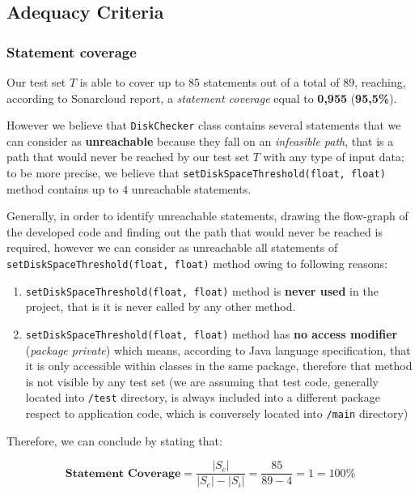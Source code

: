 \documentclass[sigconf]{acmart}
\newcommand{\abs}[1]{\left|#1\right|}
\begin{document}
\subsection{Adequacy Criteria}

\subsubsection{Statement coverage}

Our test set $T$ is able to cover up to $85$ statements out of a total of $89$, reaching, according to Sonarcloud report, a \textit{statement coverage} equal to \textbf{0,955} (\textbf{95,5\%}).

However we believe that \texttt{DiskChecker} class contains several statements that we can consider as \textbf{unreachable} because they fall on an \textit{infeasible path}, that is a path that would never be reached by our test set $T$ with any type of input data; to be more precise, we believe that  \texttt{setDiskSpaceThreshold(float, float)} method contains up to $4$ unreachable statements. 

Generally, in order to identify unreachable statements, drawing the flow-graph of the developed code and finding out the path that would never be reached is required, however we can consider as unreachable all statements of \texttt{setDiskSpaceThreshold(float, float)} method owing to following reasons:

\begin{enumerate}
\item \texttt{setDiskSpaceThreshold(float, float)} method is \textbf{never used} in the project, that is it is never called by any other method.
\item \texttt{setDiskSpaceThreshold(float, float)} method has \textbf{no access modifier} (\textit{package private}) which means, according to Java language specification, that it is only accessible within classes in the same package, therefore that method is not visible by any test set (we are assuming that test code, generally located into \texttt{/test} directory, is always included into a different package respect to application code, which is conversely located into \texttt{/main} directory)
\end{enumerate}

Therefore, we can conclude by stating that:

\begin{equation} 
\textbf{Statement Coverage} = \dfrac{\abs{S_c}}{\abs{S_e} - \abs{S_i}} = \dfrac{85}{89-4} = 1 = 100\%
\end{equation}
\end{document}
